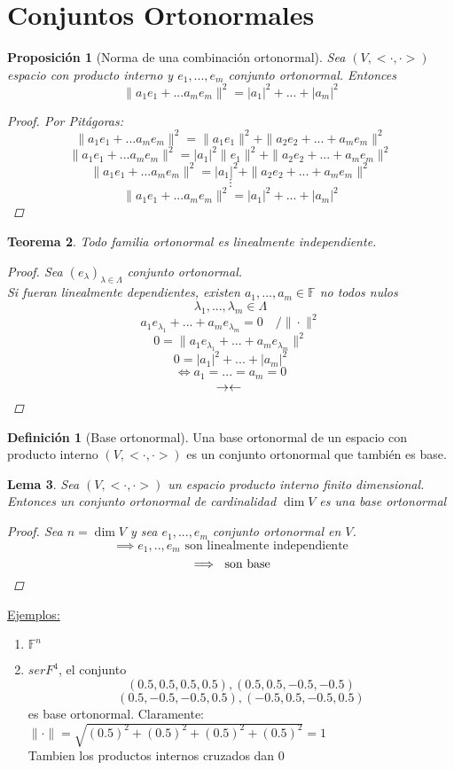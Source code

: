 \documentclass[11pt]{book}
\newcommand{\set}[1]{\mathbb{#1}}
\newcommand{\contr}{\rightarrow\leftarrow}
\newtheorem{thm}{Teorema}[section]
\newtheorem{lem}[thm]{Lema}
\newtheorem{prop}[thm]{Proposición}
\theoremstyle{definition}
\newtheorem{defn}{Definición}[section]
\begin{document}
\section{Conjuntos Ortonormales}

\begin{prop}[Norma de una combinación ortonormal]
	Sea $(V,<\cdot,\cdot>)$ espacio con producto interno y $e_1,...,e_m$ conjunto ortonormal. Entonces
	\[\|a_1e_1+...a_me_m\|^2=|a_1|^2+...+|a_m|^2\]
	\begin{proof}
		Por Pitágoras:
		\[\|a_1e_1+...a_me_m\|^2=\|a_1e_1\|^2+\|a_2e_2+...+a_me_m\|^2\]
		\[\|a_1e_1+...a_me_m\|^2=|a_1|^2\|e_1\|^2+\|a_2e_2+...+a_me_m\|^2\]
		\[\|a_1e_1+...a_me_m\|^2=|a_1|^2+\|a_2e_2+...+a_me_m\|^2\]
		\[\vdots\]
		\[\|a_1e_1+...a_me_m\|^2=|a_1|^2+...+|a_m|^2\]
	\end{proof}
\end{prop}
\begin{thm}
	Todo familia ortonormal es linealmente independiente.
	\begin{proof}
		Sea $(e_\lambda)_{\lambda\in\Lambda}$ conjunto ortonormal.\\
		Si fueran linealmente dependientes, existen $a_1,...,a_m\in\set{F}$ no todos nulos
		\[\lambda_1,...,\lambda_m\in\Lambda\]
		\[a_1e_{\lambda_1}+...+a_me_{\lambda_m}=0\quad /\|\cdot\|^2\]
		\[0=\|a_1e_{\lambda_1}+...+a_me_{\lambda_m}\|^2\]
		\[0=|a_1|^2+...+|a_m|^2\]
		\[\iff a_1=...=a_m=0\]
		\[\contr\qedhere\]
	\end{proof}
\end{thm}
\begin{defn}[Base ortonormal]
	Una base ortonormal de un espacio con producto interno $(V,<\cdot,\cdot>)$ es un conjunto ortonormal que también es base.
\end{defn}
\begin{lem}
	Sea $(V,<\cdot,\cdot>)$ un espacio producto interno finito dimensional. Entonces un conjunto ortonormal de cardinalidad $\dim V$ es una base ortonormal
	\begin{proof}
		Sea $n=\dim V$ y sea $e_1,...,e_m$ conjunto ortonormal en $V$.
		\[\implies e_1,..,e_m\textrm{ son linealmente independiente}\]
		\[\implies\textrm{ son base}\qedhere\]
	\end{proof}
\end{lem}
\underline{Ejemplos:}
\begin{enumerate}
	\item $\set{F}^n$

	\item $ser{F}^4$, el conjunto
	\[(0.5,0.5,0.5,0.5),(0.5,0.5,-0.5,-0.5)\]
	\[(0.5,-0.5,-0.5,0.5),(-0.5,0.5,-0.5,0.5)\]
	es base ortonormal.
	Claramente: $\|\cdot\|=\sqrt{(0.5)^2+(0.5)^2+(0.5)^2+(0.5)^2}=1$\\
	Tambien los productos internos cruzados dan 0
\end{enumerate}
\end{document}
